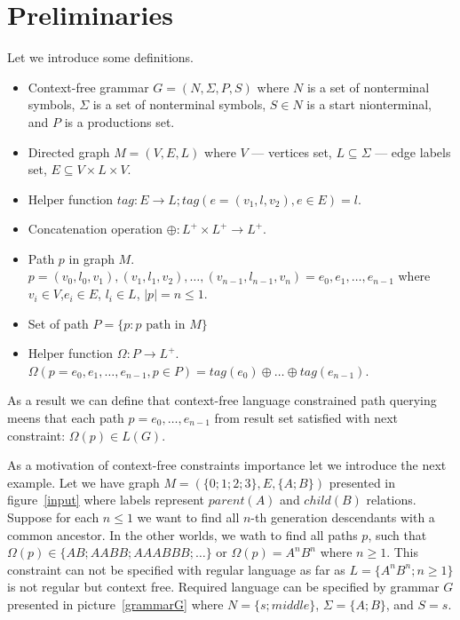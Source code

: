 \documentclass{sig-alternate} %
\begin{document}
\section{Preliminaries}

Let we introduce some definitions.
\begin{itemize}
  \item Context-free grammar $G=(N, \Sigma, P, S)$ where $N$ is a set of nonterminal symbols, $\Sigma$ is a set of nonterminal symbols, $S \in N$ is a start nionterminal, and $P$ is a productions set. 
  \item Directed graph $M = (V,E,L)$ where $V$ --- vertices set, $L \subseteq \Sigma$ --- edge labels set, $E\subseteq V\times L\times V$.
  \item Helper function $tag: E \rightarrow L; tag(e = (v_1,l,v_2), e \in E) = l$.
  \item Concatenation operation $\oplus: L^+ \times L^+ \rightarrow L^+$.
  \item Path $p$ in graph $M$. \\ $p = (v_0,l_0,v_1),(v_1,l_1,v_2),\dots,(v_{n-1},l_{n-1},v_n) = e_0,e_1,\dots,e_{n-1}$ where $v_i \in V$,$e_i \in E$, $l_i \in L$, $|p| = n \leq 1$. 
  \item Set of path $P = \{p: p \text{ path in } M\}$
  \item Helper function $\Omega: P \rightarrow L^+$.\\ $\Omega(p = e_0,e_1,\dots,e_{n-1}, p \in P) = tag (e_0) \oplus \dots \oplus tag (e_{n-1})$.
\end{itemize}

As a result we can define that context-free language constrained path querying meens that each path $p = e_0,\dots,e_{n-1}$ from result set satisfied with next constraint: $\Omega(p) \in L(G)$. 

As a motivation of context-free constraints importance let we introduce the next example.
Let we have graph $M=(\{0;1;2;3\},E,\{A;B\})$ presented in figure~\ref{input} where labels represent $parent (A)$ and $child (B)$ relations. 
Suppose for each $n \leq 1$ we want to find all $n$-th generation descendants with a common ancestor.
In the other worlds, we wath to find all paths $p$, such that $\Omega(p) \in \{AB; AABB; AAABBB; \dots\}$ or $\Omega(p) = A^n B^n$ where $n \geq 1$.
This constraint can not be specified with regular language as far as $L=\{A^n B^n; n \geq 1\}$ is not regular but context free.
Required language can be specified by grammar $G$ presented in picture~\ref{grammarG} where $N = \{s; middle\}$, $\Sigma = \{A; B\}$, and $S = s$.
\end{document}
